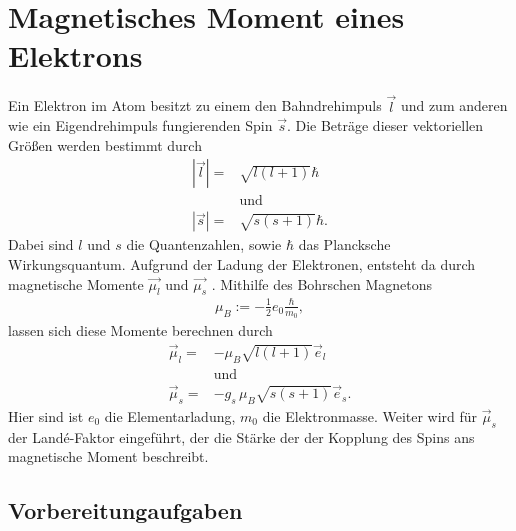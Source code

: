 

\section{Magnetisches Moment eines Elektrons}
Ein Elektron im Atom besitzt zu einem den Bahndrehimpuls $\vec{l}$ und zum anderen wie ein Eigendrehimpuls fungierenden Spin $\vec{s}$.
Die Beträge dieser vektoriellen Größen werden bestimmt durch
\begin{align}
	|\vec{l}|=&\sqrt{l(l+1)}\hbar\\
	\nonumber &\text{und}\\
	|\vec{s}|=&\sqrt{s(s+1)}\hbar.
\end{align}
Dabei sind $l$ und $s$ die Quantenzahlen, sowie $\hbar$ das Plancksche Wirkungsquantum.
Aufgrund der Ladung der Elektronen, entsteht da durch magnetische Momente $\vec{\mu_l}$ und $\vec{\mu_s}$ .
Mithilfe des Bohrschen Magnetons 
\begin{align}
	\mu_B:=-\frac{1}{2}e_0 \frac{\hbar}{m_0},
\end{align}
lassen sich diese Momente berechnen durch
\begin{align}
	\vec{\mu}_l=&-\mu_B\sqrt{l(l+1)}\vec{e}_l\\
	\nonumber &\text{und}\\
	\vec{\mu}_s=&-g_s\,\mu_B\sqrt{s(s+1)}\vec{e}_s.
\end{align}
Hier sind ist $e_0$ die Elementarladung, $m_0$ die Elektronmasse.
Weiter wird für $\vec{\mu}_s$ der Landé-Faktor eingeführt, der die Stärke der der Kopplung des Spins ans magnetische Moment beschreibt.


\subsection{Vorbereitungaufgaben}
\newpage

